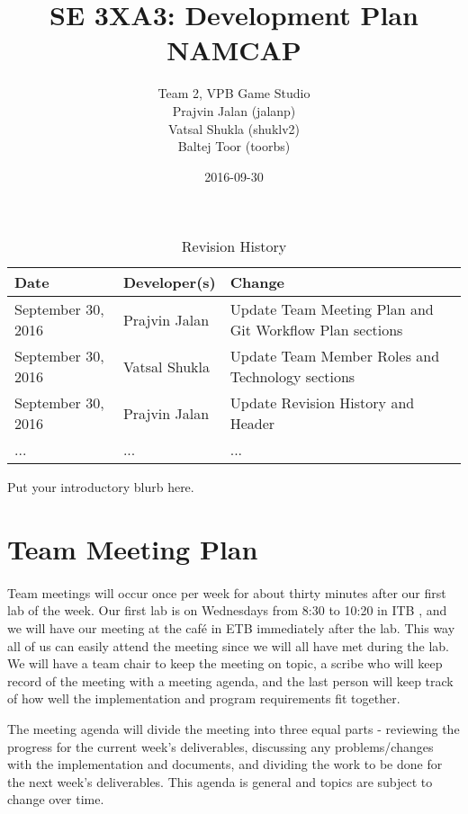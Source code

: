 \documentclass{article}
\title{SE 3XA3: Development Plan\\NAMCAP}
\author{Team 2, VPB Game Studio
		\\ Prajvin Jalan (jalanp)
		\\ Vatsal Shukla (shuklv2)
		\\ Baltej Toor (toorbs)
}
\date{2016-09-30}
\begin{document}
\begin{table}[hp]
\caption{Revision History} \label{TblRevisionHistory}
\begin{tabularx}{\textwidth}{llX}
\toprule
\textbf{Date} & \textbf{Developer(s)} & \textbf{Change}\\
\midrule
September 30, 2016 & Prajvin Jalan & Update Team Meeting Plan and Git Workflow Plan sections\\
September 30, 2016 & Vatsal Shukla & Update Team Member Roles and Technology sections \\
September 30, 2016 & Prajvin Jalan & Update Revision History and Header\\
... & ... & ...\\
\bottomrule
\end{tabularx}
\end{table}

\newpage

\maketitle

Put your introductory blurb here.

\section{Team Meeting Plan}

\paragraph{}
Team meetings will occur once per week for about thirty minutes after our first lab of the week. Our first lab is on Wednesdays from 8:30 to 10:20 in ITB , and we will have our meeting at the café in ETB immediately after the lab. This way all of us can easily attend the meeting since we will all have met during the lab. We will have a team chair to keep the meeting on topic, a scribe who will keep record of the meeting with a meeting agenda, and the last person will keep track of how well the implementation and program requirements fit together.\par The meeting agenda will divide the meeting into three equal parts - reviewing the progress for the current week's deliverables, discussing any problems/changes with the implementation and documents, and dividing the work to be done for the next week's deliverables. This agenda is general and topics are subject to change over time.
\end{document}
